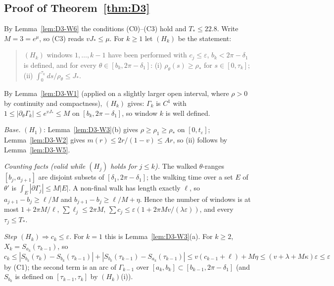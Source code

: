 \subsection{Proof of Theorem~\ref{thm:D3}}
By Lemma~\ref{lem:D3-W6} the conditions (C0)--(C3) hold and $T_*\le22.8$. Write $M=3=e^\mu$, so (C3) reads $vJ_*\le\mu$. For
$k\ge1$ let $(H_k)$ be the statement:
\begin{quote}
$(H_k)$ windows $1,\dots,k-1$ have been performed with $c_j\le\varepsilon$, $b_k<2\pi-\delta_1$ is defined, and for every
$\theta\in[b_k,2\pi-\delta_1]$: (i) $\rho_\theta(s)\ge\rho_*$ for $s\in[0,\tau_k]$; (ii) $\int_0^{\tau_k}ds/\rho_\theta\le J_*$.
\end{quote}
By Lemma~\ref{lem:D3-W1} (applied on a slightly larger open interval, where $\rho>0$ by continuity and compactness), $(H_k)$
gives: $\Gamma_k$ is $C^1$ with $1\le|\partial_\theta\Gamma_k|\le e^{vJ_*}\le M$ on $[b_k,2\pi-\delta_1]$, so window $k$ is well
defined.

\emph{Base.} $(H_1)$: Lemma~\ref{lem:D3-W3}(b) gives $\rho\ge\rho_1\ge\rho_*$ on $[0,t_\varepsilon]$; Lemma~\ref{lem:D3-W2} gives
$m(r)\le2r/(1-v)\le Ar$, so (ii) follows by Lemma~\ref{lem:D3-W5}.

\emph{Counting facts (valid while $(H_j)$ holds for $j\le k$).} The walked $\theta$-ranges $[b_j,a_{j+1}]$ are disjoint subsets of
$[\delta_1,2\pi-\delta_1]$; the walking time over a set $E$ of $\theta'$ is $\int_E|\partial\Gamma_j|\le M|E|$. A non-final walk has
length exactly $\ell$, so $a_{j+1}-b_j\ge\ell/M$ and $b_{j+1}-b_j\ge\ell/M+\eta$. Hence the number of windows is at most
$1+2\pi M/\ell$, $\sum\ell_j\le2\pi M$, $\sum c_j\le\varepsilon(1+2\pi Mv/(\lambda\varepsilon))$, and every $\tau_j\le T_*$.

\emph{Step $(H_k)\Rightarrow c_k\le\varepsilon$.} For $k=1$ this is Lemma~\ref{lem:D3-W3}(a). For $k\ge2$, $X_k=S_{a_k}(\tau_{k-1})$, so
\[
c_k\le|S_{b_k}(\tau_k)-S_{b_k}(\tau_{k-1})|+|S_{b_k}(\tau_{k-1})-S_{a_k}(\tau_{k-1})|\le v(c_{k-1}+\ell)+M\eta
\le(v+\lambda+M\kappa)\varepsilon\le\varepsilon
\]
by (C1); the second term is an arc of $\Gamma_{k-1}$ over $[a_k,b_k]\subset[b_{k-1},2\pi-\delta_1]$ (and $S_{b_k}$ is defined on
$[\tau_{k-1},\tau_k]$ by $(H_k)$(i)).

